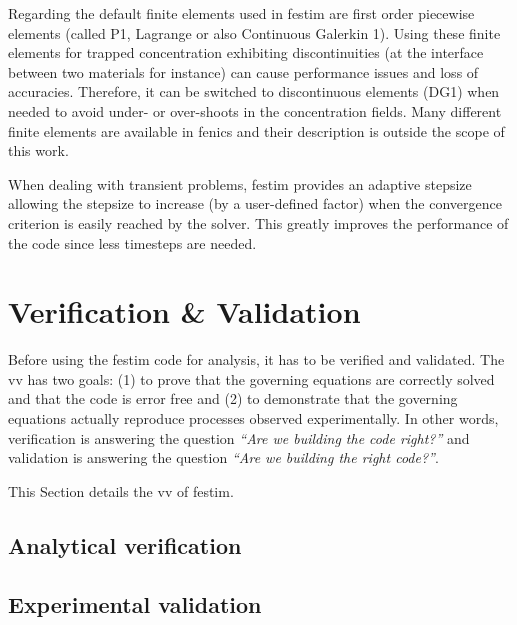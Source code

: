 Regarding the default finite elements used in \gls{festim} are first order piecewise elements (called P1, Lagrange or also Continuous Galerkin 1).
Using these finite elements for trapped concentration exhibiting discontinuities (at the interface between two materials for instance) can cause performance issues and loss of accuracies.
Therefore, it can be switched to discontinuous elements (DG1) when needed to avoid under- or over-shoots in the concentration fields.
Many different finite elements are available in \gls{fenics} \cite{noauthor_periodic_nodate} and their description is outside the scope of this work.

When dealing with transient problems, \gls{festim} provides an adaptive stepsize allowing the stepsize to increase (by a user-defined factor) when the convergence criterion is easily reached by the solver.
This greatly improves the performance of the code since less timesteps are needed.



\section{Verification \& Validation}

Before using the \gls{festim} code for analysis, it has to be verified and validated.
The \gls{vv} has two goals: (1) to prove that the governing equations are correctly solved and that the code is error free and (2) to demonstrate that the governing equations actually reproduce processes observed experimentally.
In other words, verification is answering the question \textit{``Are we building the code right?''} and validation is answering the question \textit{``Are we building the right code?''}.

This Section details the \gls{vv} of \gls{festim}.

\subsection{Analytical verification}



\subsection{Experimental validation}



